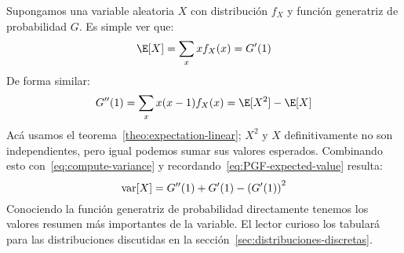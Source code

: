   Supongamos una variable aleatoria \(X\)
  con distribución \(f_X\)
  y función generatriz de probabilidad \(G\).
  Es simple ver que:
  \begin{equation}
    \label{eq:PGF-expected-value}
    \E[X]
      = \sum_x x f_X(x)
      = G'(1)
  \end{equation}
  De forma similar:
  \begin{equation*}
    G''(1)
      = \sum_x x (x - 1) f_X(x)
      = \E[X^2] - \E[X]
  \end{equation*}
  Acá usamos el teorema~\ref{theo:expectation-linear};
  \(X^2\) y \(X\) definitivamente no son independientes,
  pero igual podemos sumar sus valores esperados.
  Combinando esto con~\eqref{eq:compute-variance}
  y recordando~\eqref{eq:PGF-expected-value}
  resulta:
  \begin{equation}
    \label{eq:PGF-variance}
    \operatorname{var}[X]
      = G''(1) + G'(1) - \left( G'(1) \right)^2
  \end{equation}
  Conociendo la función generatriz de probabilidad
  directamente tenemos los valores resumen
  más importantes de la variable.
  El lector curioso los tabulará para las distribuciones
  discutidas en la sección~\ref{sec:distribuciones-discretas}.

